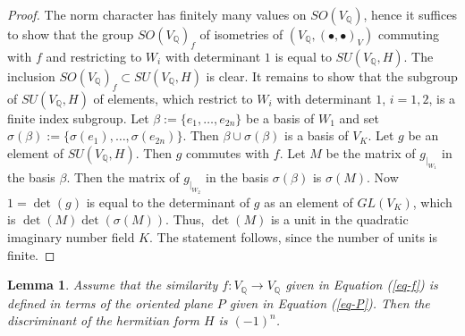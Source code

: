 \documentclass[12pt]{amsart}
\numberwithin{equation}{subsection}
\theoremstyle{plain}
\newtheorem{lem}[thm]{Lemma}
\theoremstyle{definition}
\newcommand{\QQ}{{\mathbb Q}}
\newcommand{\restricted}[2]{#1_{\mid_{#2}}}
\begin{document}
\begin{proof}
The norm character has finitely many values on $SO(V_\QQ)$, hence it suffices to show that the group $SO(V_\QQ)_f$ of isometries of $(V_\QQ,(\bullet,\bullet)_V)$ commuting with $f$ and restricting to $W_i$ with determinant $1$ is equal to $SU(V_\QQ,H)$. The inclusion $SO(V_\QQ)_f\subset SU(V_\QQ,H)$
is clear. It remains to show that the subgroup of $SU(V_\QQ,H)$ of elements, which restrict to $W_i$ with determinant $1$, $i=1,2$, is a finite index subgroup.
Let $\beta:=\{e_1, \dots, e_{2n}\}$ be a basis of $W_1$ and set $\sigma(\beta):=\{\sigma(e_1), \dots, \sigma(e_{2n})\}$. 
Then 
$\beta\cup\sigma(\beta)$ is a basis of
$V_K$. Let $g$ be an element of $SU(V_\QQ,H)$. Then $g$ commutes with $f$. Let $M$ be the matrix of $\restricted{g}{W_1}$ in the basis $\beta$.
Then the matrix of $\restricted{g}{W_2}$ in the basis $\sigma(\beta)$ is $\sigma(M)$. Now $1=\det(g)$ is equal to the determinant of $g$ as an element of $GL(V_K)$, which is $\det(M)\det(\sigma(M))$. Thus, $\det(M)$ is a unit in the quadratic imaginary number field $K$. The statement follows, since the number of units is finite.
\end{proof}

\begin{lem}
\label{lemma-the-discriminant-is-minus-1-to-the-n}
Assume that the similarity $f:V_\QQ\rightarrow V_\QQ$ given in Equation (\ref{eq-f}) is defined in terms of the oriented plane $P$ given in Equation (\ref{eq-P}).
Then the discriminant of the hermitian form $H$ is $(-1)^n$.
\end{lem}
\end{document}
